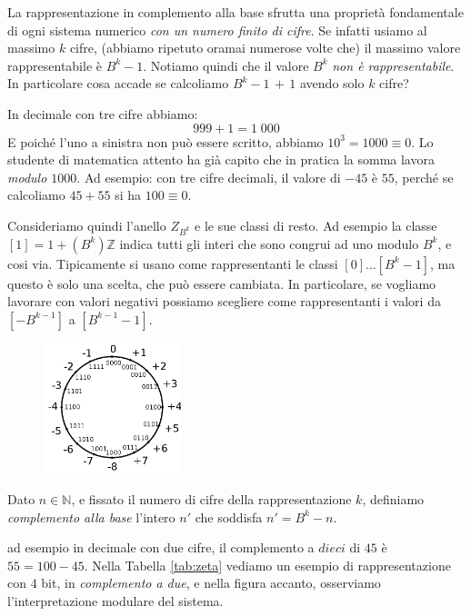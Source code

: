 La rappresentazione in complemento alla base sfrutta una proprietà fondamentale
di ogni sistema numerico \emph{con un numero finito di cifre}. Se infatti usiamo al massimo $k$ cifre, (abbiamo ripetuto oramai numerose volte che) il massimo valore rappresentabile è $B^k-1$. Notiamo quindi che il valore
$B^k$ \emph{non è rappresentabile}. In particolare cosa accade se calcoliamo $B^k-1\,+\,1$ avendo solo $k$ cifre?

\begin{ex} In decimale con tre cifre abbiamo:
	\[ \boxed{9}\boxed{9}\boxed{9} + 1 = 1\;\boxed{0}\boxed{0}\boxed{0} \]
E poiché l'uno a sinistra non può essere scritto, abbiamo $10^3 = 1000 \equiv 0$. Lo studente di matematica attento ha già capito che in pratica la somma lavora \emph{modulo $1000$}. Ad esempio: con tre cifre decimali, il valore di $-45$ è $55$, perché se calcoliamo $45 + 55$ si ha $100 \equiv 0$.
\end{ex}

Consideriamo quindi l'anello $Z_{B^k}$ e le sue classi di resto. Ad esempio la
classe $[1] = 1 + (B^k)\mathbb{Z}$ indica tutti gli interi che sono congrui ad
uno modulo $B^k$, e cosi via. Tipicamente si usano come rappresentanti le classi $[0] \ldots [B^k-1]$, ma questo è solo una scelta, che può
essere cambiata. In particolare, se vogliamo lavorare con valori negativi
possiamo scegliere come rappresentanti i valori da $[-B^{k-1}]$ a $[B^{k-1}-1]$.

\begin{figure}\vspace{-3ex}
 \includegraphics[width=4cm]{2Komplement.png}
 \label{fig:comp2}
\end{figure}

\begin{defn}
Dato $n \in \mathbb{N}$, e fissato il numero di cifre della rappresentazione $k$, definiamo \emph{complemento alla base} l'intero $n'$ che soddisfa $n'= B^k-n$.
\end{defn}
\noindent ad esempio in decimale con due cifre, il complemento a
$dieci$ di $45$ è $55 = 100-45$. Nella Tabella \ref{tab:zeta} vediamo un
esempio di rappresentazione con $4$ bit, in \emph{complemento a due}, e nella figura accanto, osserviamo l'interpretazione modulare del sistema.

